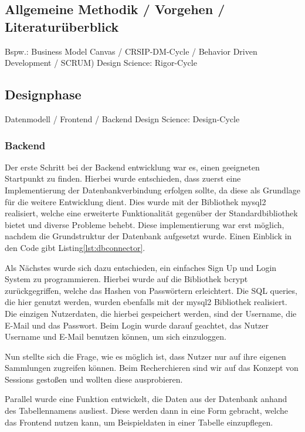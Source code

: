 \subsection{Allgemeine Methodik / Vorgehen / Literaturüberblick}\label{subsec:Methodik}
Bspw.: Business Model Canvas / CRSIP-DM-Cycle / Behavior Driven Development / SCRUM)
Design Science: Rigor-Cycle

\subsection{Designphase}\label{subsec:Designphase}
Datenmodell / Frontend / Backend
Design Science: Design-Cycle

\subsubsection{Backend}
Der erste Schritt bei der Backend entwicklung war es, einen geeigneten Startpunkt zu finden.
Hierbei wurde entschieden, dass zuerst eine Implementierung der Datenbankverbindung erfolgen sollte, da diese als Grundlage für die weitere Entwicklung dient.
Dies wurde mit der Bibliothek mysql2 realisiert, welche eine erweiterte Funktionalität gegenüber der Standardbibliothek bietet und diverse Probleme behebt.
Diese implementierung war erst möglich, nachdem die Grundstruktur der Datenbank aufgesetzt wurde.
Einen Einblick in den Code gibt Listing\ref{lst:dbconnector}.



Als Nächstes wurde sich dazu entschieden, ein einfaches Sign Up und Login System zu programmieren.
Hierbei wurde auf die Bibliothek bcrypt zurückgegriffen, welche das Hashen von Passwörtern erleichtert.
Die SQL queries, die hier genutzt werden, wurden ebenfalls mit der mysql2 Bibliothek realisiert.
Die einzigen Nutzerdaten, die hierbei gespeichert werden, sind der Username, die E-Mail und das Passwort.
Beim Login wurde darauf geachtet, das Nutzer Username und E-Mail benutzen können, um sich einzuloggen.

Nun stellte sich die Frage, wie es möglich ist, dass Nutzer nur auf ihre eigenen Sammlungen zugreifen können.
Beim Recherchieren sind wir auf das Konzept von Sessions gestoßen und wollten diese ausprobieren.

Parallel wurde eine Funktion entwickelt, die Daten aus der Datenbank anhand des Tabellennamens ausliest.
Diese werden dann in eine Form gebracht, welche das Frontend nutzen kann, um Beispieldaten in einer Tabelle einzupflegen.



